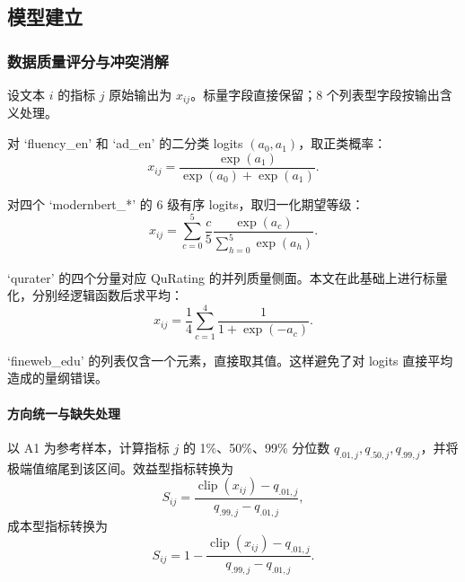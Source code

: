 \documentclass[bwprint]{gmcmthesis}
\numberwithin{equation}{section}
\numberwithin{figure}{section}
\numberwithin{table}{section}
\begin{document}
    
    \subsection{模型建立}   %
        \subsubsection{数据质量评分与冲突消解}
        设文本 $i$ 的指标 $j$ 原始输出为 $x_{ij}$。标量字段直接保留；8 个列表型字段按输出含义处理。

        对 `fluency\_en' 和 `ad\_en' 的二分类 logits $(a_0,a_1)$，取正类概率：
        \begin{equation}
        x_{ij}=\frac{\exp(a_1)}{\exp(a_0)+\exp(a_1)}.
        \label{eq:binary}
        \end{equation}
        
        对四个 `modernbert\_*' 的 6 级有序 logits，取归一化期望等级：
        \begin{equation}
        x_{ij}=\sum_{c=0}^{5}\frac{c}{5}
        \frac{\exp(a_c)}{\sum_{h=0}^{5}\exp(a_h)}.
        \label{eq:ordinal}
        \end{equation}
        
        `qurater' 的四个分量对应 QuRating 的并列质量侧面\textsuperscript{\cite{wettig2024qurating}}。本文在此基础上进行标量化，分别经逻辑函数后求平均：
        \begin{equation}
        x_{ij}=\frac{1}{4}\sum_{c=1}^{4}\frac{1}{1+\exp(-a_c)}.
        \label{eq:qurater}
        \end{equation}
        
        `fineweb\_edu' 的列表仅含一个元素，直接取其值。这样避免了对 logits 直接平均造成的量纲错误。


        \paragraph{方向统一与缺失处理}
        以 A1 为参考样本，计算指标 $j$ 的 1\%、50\%、99\% 分位数 $q_{.01,j},q_{.50,j},q_{.99,j}$，并将极端值缩尾到该区间。效益型指标转换为
        \begin{equation}
        S_{ij}=\frac{\operatorname{clip}(x_{ij})-q_{.01,j}}{q_{.99,j}-q_{.01,j}},
        \label{eq:benefit}
        \end{equation}
        成本型指标转换为
        \begin{equation}
        S_{ij}=1-\frac{\operatorname{clip}(x_{ij})-q_{.01,j}}{q_{.99,j}-q_{.01,j}}.
        \label{eq:cost}
        \end{equation}
        
\end{document}
